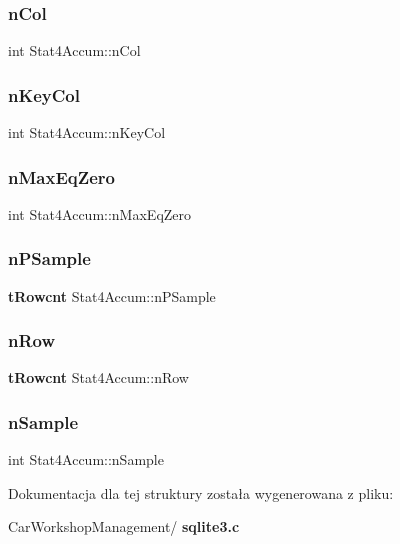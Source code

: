 \mbox{\label{struct_stat4_accum_a4b5d9944be8bd28e2dcaaa10d23702db}} 
\subsubsection{nCol}
{\footnotesize\ttfamily int Stat4\+Accum\+::n\+Col}

\mbox{\label{struct_stat4_accum_a018b3aa526f4d376e55042e290c935c4}} 
\subsubsection{nKeyCol}
{\footnotesize\ttfamily int Stat4\+Accum\+::n\+Key\+Col}

\mbox{\label{struct_stat4_accum_a7da60d287b0f08aa813fa546c9559431}} 
\subsubsection{nMaxEqZero}
{\footnotesize\ttfamily int Stat4\+Accum\+::n\+Max\+Eq\+Zero}

\mbox{\label{struct_stat4_accum_ac86c036108462008795ebfb7994ff674}} 
\subsubsection{nPSample}
{\footnotesize\ttfamily \textbf{ t\+Rowcnt} Stat4\+Accum\+::n\+P\+Sample}

\mbox{\label{struct_stat4_accum_a7f06c1f2e4790e21b25aa68e5340f0b3}} 
\subsubsection{nRow}
{\footnotesize\ttfamily \textbf{ t\+Rowcnt} Stat4\+Accum\+::n\+Row}

\mbox{\label{struct_stat4_accum_ae96fc8b759131bd3d968086a009a9170}} 
\subsubsection{nSample}
{\footnotesize\ttfamily int Stat4\+Accum\+::n\+Sample}



Dokumentacja dla tej struktury została wygenerowana z pliku\+:\begin{DoxyCompactItemize}
\item 
Car\+Workshop\+Management/\textbf{ sqlite3.\+c}\end{DoxyCompactItemize}
